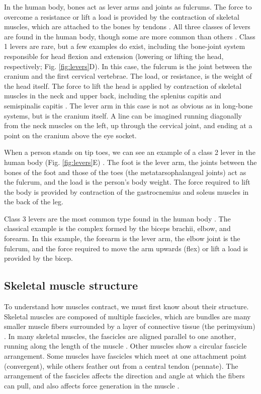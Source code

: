 \documentclass[12pt]{article}
\begin{document}
In the human body, bones act as lever arms and joints as fulcrums. The force to overcome a resistance or lift a load is provided by the contraction of skeletal muscles, which are attached to the bones by tendons \cite{leversOLI,openStax2016lever}. All three classes of levers are found in the human body, though some are more common than others \cite{leversOLI}. Class 1 levers are rare, but a few examples do exist, including the bone-joint system responsible for head flexion and extension (lowering or lifting the head, respectively; Fig. \ref{fig:levers}D). In this case, the fulcrum is the joint between the cranium and the first cervical vertebrae. The load, or resistance, is the weight of the head itself. The force to lift the head is applied by contraction of skeletal muscles in the neck and upper back, including the splenius capitis and semispinalis capitis \cite{openStax2016axial}.  The lever arm in this case is not as obvious as in long-bone systems, but is the cranium itself. A line can be imagined running diagonally from the neck muscles on the left, up through the cervical joint, and ending at a point on the cranium above the eye socket.

When a person stands on tip toes, we can see an example of a class 2 lever in the human body (Fig. \ref{fig:levers}E) \cite{leversOLI}. The foot is the lever arm, the joints between the bones of the foot and those of the toes (the metatarsophalangeal joints) act as the fulcrum, and the load is the person's body weight. The force required to lift the body is provided by contraction of the gastrocnemius and soleus muscles in the back of the leg.

Class 3 levers are the most common type found in the human body \cite{leversOLI}. The classical example is the complex formed by the biceps brachii, elbow, and forearm. In this example, the forearm is the lever arm, the elbow joint is the fulcrum, and the force required to move the arm upwards (flex) or lift a load is provided by the bicep.

\subsection*{Skeletal muscle structure}

To understand how muscles contract, we must first know about their structure. Skeletal muscles are composed of multiple fascicles, which are bundles are many smaller muscle fibers surrounded by a layer of connective tissue (the perimysium) \cite{openStax2016muscle}. In many skeletal muscles, the fascicles are aligned parallel to one another, running along the length of the muscle \cite{openStax2016lever}. Other muscles show a circular fascicle arrangement. Some muscles have fascicles which meet at one attachment point (convergent), while others feather out from a central tendon (pennate). The arrangement of the fascicles affects the direction and angle at which the fibers can pull, and also affects force generation in the muscle \cite{openStax2016lever}.
\end{document}
